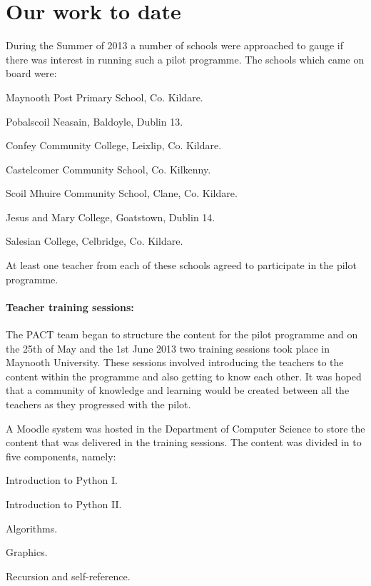 \documentclass[a4paper]{article}
\begin{document}
\section{Our work to date} \label{sect:OurWork}
During the Summer of 2013 a number of schools were approached to gauge if there was interest in running such a pilot programme. The schools which came on board were:
\begin{compactitem}
  \item Maynooth Post Primary School, Co. Kildare.
  \item Pobalscoil Neasain, Baldoyle, Dublin 13.
  \item Confey Community College, Leixlip, Co. Kildare.
  \item Castelcomer Community School, Co. Kilkenny.
  \item Scoil Mhuire Community School, Clane, Co. Kildare.
  \item Jesus and Mary College, Goatstown, Dublin 14.
  \item Salesian College, Celbridge, Co. Kildare.
\end{compactitem}

At least one teacher from each of these schools agreed to participate in the pilot programme. 

\paragraph{Teacher training sessions:}
The PACT team began to structure the content for the pilot programme and on the 25th of May and the 1st June 2013 two training sessions took place in Maynooth University. These sessions involved introducing the teachers to the content within the programme and also getting to know each other. It was hoped that a community of knowledge and learning would be created between all the teachers as they progressed with the pilot.

A Moodle system was hosted in the Department of Computer Science to store the content that was delivered in the training sessions. The content was divided in to five components, namely:

\begin{compactenum}
  \item Introduction to Python I.
  \item Introduction to Python II.
  \item Algorithms.
  \item Graphics.
  \item Recursion and self-reference.
\end{compactenum}
\end{document}
